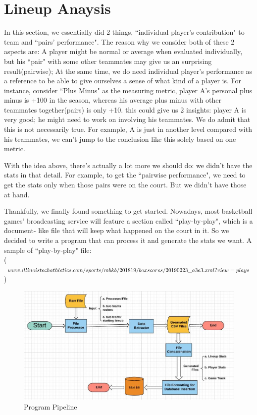 \documentclass[conference]{IEEEtran}
\begin{document}
\section{Lineup Anaysis}
In this section, we essentially did 2 things, ``individual player's contribution" to team and ``pairs' performance". The reason why we consider both of these 2 aspects are: A player might be normal or average when evaluated individually, but his ``pair" with some other teammates may give us an surprising result(pairwise); At the same time, we do need individual player's performance as a reference to be able to give ourselves a sense of what kind of a player is. For instance, consider ``Plus Minus" as the measuring metric, player A's personal plus minus is +100 in the season, whereas his average plus minus with other teammates together(pairs) is only +10. this could give us 2 insights: player A is very good; he might need to work on involving his teammates. We do admit that this is not necessarily true. For example, A is just in another level compared with his teammates, we can't jump to the conclusion like this solely based on one metric.

With the idea above, there's actually a lot more we should do: we didn't have the stats in that detail. For example, to get the ``pairwise performance", we need to get the stats only when those pairs were on the court. But we didn't have those at hand.

Thankfully, we finally found something to get started. Nowadays, most basketball games' broadcasting service will feature a section called ``play-by-play", which is a document- like file that will keep what happened on the court in it. So we decided to write a program that can process it and generate the stats we want. A sample of ``play-by-play" file: \\
($www.illinoistechathletics.com/sports/mbkb/2018\-19/boxscores/20190223\_a3e3.xml?view=plays$)

\begin{figure}[h!]
  \includegraphics[width=\linewidth]{flowchart.jpg}
  \caption{Program Pipeline}
  \vspace{-1mm}
  \label{fig:flowchart}
\end{figure}
\end{document}
